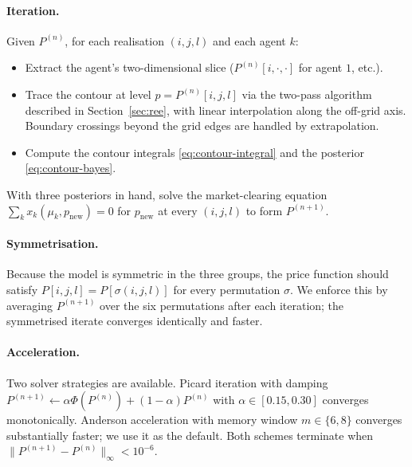 \documentclass[12pt,letterpaper]{article}
\theoremstyle{definition}
\theoremstyle{remark}
\newcommand{\1}{\mathbf{1}}
\begin{document}
\paragraph{Iteration.} Given $P^{(n)}$, for each realisation $(i,j,l)$ and
each agent $k$:
\begin{itemize}[topsep=2pt,itemsep=2pt]
   \item Extract the agent's two-dimensional slice
         ($P^{(n)}[i,\cdot,\cdot]$ for agent $1$, etc.).
   \item Trace the contour at level $p=P^{(n)}[i,j,l]$ via the two-pass
         algorithm described in Section~\ref{sec:ree}, with linear
         interpolation along the off-grid axis. Boundary crossings beyond
         the grid edges are handled by extrapolation.
   \item Compute the contour integrals \eqref{eq:contour-integral} and
         the posterior \eqref{eq:contour-bayes}.
\end{itemize}
With three posteriors in hand, solve the market-clearing equation
$\sum_{k}x_{k}(\mu_{k},p_{\text{new}})=0$ for $p_{\text{new}}$ at every
$(i,j,l)$ to form $P^{(n+1)}$.

\paragraph{Symmetrisation.} Because the model is symmetric in the three
groups, the price function should satisfy $P[i,j,l]=P[\sigma(i,j,l)]$ for
every permutation $\sigma$. We enforce this by averaging $P^{(n+1)}$ over
the six permutations after each iteration; the symmetrised iterate
converges identically and faster.

\paragraph{Acceleration.} Two solver strategies are available. Picard
iteration with damping
$P^{(n+1)}\leftarrow \alpha\Phi(P^{(n)})+(1-\alpha)P^{(n)}$ with
$\alpha\in[0.15,0.30]$ converges monotonically. Anderson acceleration with
memory window $m\in\{6,8\}$ converges substantially faster; we use it as
the default. Both schemes terminate when
$\|P^{(n+1)}-P^{(n)}\|_{\infty}<10^{-6}$.
\end{document}
